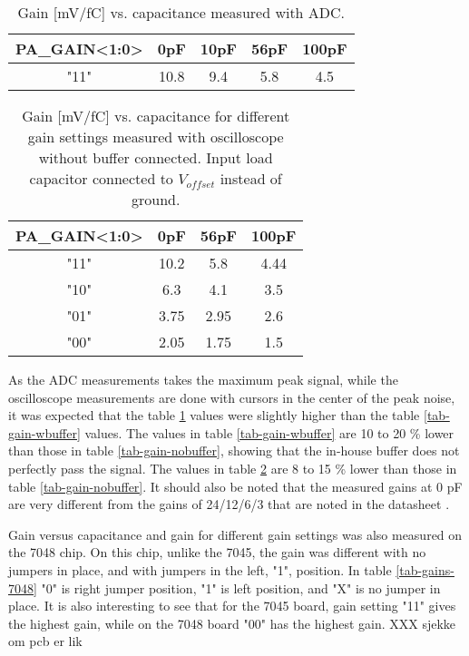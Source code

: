 \documentclass[../main/thesis.tex]{subfiles}
\begin{document}
\begin{table}[h!]
	\begin{center}
		\caption{Gain [mV/fC] vs. capacitance measured with ADC.}
		\label{tab-gain-adc}
		\begin{tabular}{ccccc}\toprule
			\textbf{PA\_GAIN<1:0>} & \textbf{0pF}  & \textbf{10pF} & \textbf{56pF} & \textbf{100pF} \\ \midrule
			"11"     & 10.8 & 9.4  & 5.8  & 4.5   \\ \bottomrule
		\end{tabular}
	\end{center}
\end{table}

\begin{table}[h!]
	\begin{center}
		\caption{Gain [mV/fC] vs. capacitance for different gain settings measured with oscilloscope without buffer connected. Input load capacitor connected to $V_{offset}$ instead of ground.}
		\label{tab-gain-nobuffer-offset}
		\begin{tabular}{cccc}\toprule
			\textbf{PA\_GAIN<1:0>} & \textbf{0pF}  & \textbf{56pF} & \textbf{100pF} \\ \midrule
			"11"     & 10.2 & 5.8  & 4.44  \\
			"10"     & 6.3  & 4.1  & 3.5   \\
			"01"     & 3.75 & 2.95 & 2.6   \\
			"00"     & 2.05 & 1.75 & 1.5   \\ \bottomrule
		\end{tabular}
	\end{center}
\end{table}

As the ADC measurements takes the maximum peak signal, while the oscilloscope measurements are done with cursors in the center of the peak noise, it was expected that the table \ref{tab-gain-adc} values were slightly higher than the table \ref{tab-gain-wbuffer} values. The values in table \ref{tab-gain-wbuffer} are 10 to 20 \% lower than those in table \ref{tab-gain-nobuffer}, showing that the in-house buffer does not perfectly pass the signal. The values in table \ref{tab-gain-nobuffer-offset} are 8 to 15 \% lower than those in table \ref{tab-gain-nobuffer}. It should also be noted that the measured gains at 0 pF are very different from the gains of 24/12/6/3 that are noted in the datasheet \citep{IDE1180}.

Gain versus capacitance and gain for different gain settings was also measured on the 7048 chip. On this chip, unlike the 7045, the gain was different with no jumpers in place, and with jumpers in the left, "1", position. In table \ref{tab-gains-7048} "0" is right jumper position, "1" is left position, and "X" is no jumper in place. It is also interesting to see that for the 7045 board, gain setting "11" gives the highest gain, while on the 7048 board "00" has the highest gain. XXX sjekke om pcb er lik
\end{document}
